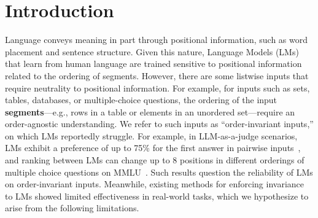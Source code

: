 
\section{Introduction}
%


Language conveys meaning in part through positional information, such as word placement and sentence structure. %
Given this nature, Language Models (LMs) that learn from human language are trained sensitive to positional information related to the ordering of segments. However, there are some listwise inputs that
require neutrality to positional information.
For example, for inputs such as sets, tables, databases, or multiple-choice questions, the ordering of the input \textbf{segments}---e.g., rows in a table or elements in an unordered set---require an order-agnostic understanding. We refer to such inputs as ``order-invariant inputs,'' on which LMs reportedly struggle.
For example, in LLM-as-a-judge scenarios, LMs exhibit a preference of up to 75\% for the first answer in pairwise inputs~\cite{zheng2024judging}, and ranking between LMs can change up to 8 positions in different orderings of multiple choice questions on MMLU~\cite{alzahrani2024benchmarkstargetsrevealingsensitivity}. 
Such results question the reliability of LMs on order-invariant inputs. Meanwhile, existing methods for enforcing invariance to LMs showed limited effectiveness in real-world tasks, which we hypothesize to arise from
the following limitations.

